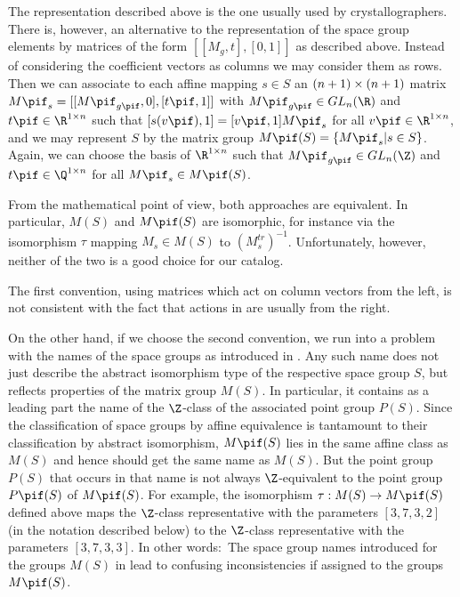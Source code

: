 The representation described above is the one usually used by
crystallographers. There is, however, an alternative to the
representation of the space group elements by matrices of the form
$[ [ M_g, t ], [ 0, 1 ] ]$ as described above. Instead of 
considering the coefficient vectors as columns we may consider 
them as rows.  Then we can associate to each affine mapping
$s \in S$ an $(n+1) \times (n+1)$ matrix $M\pif_s =
[ [ M\pif_{g\pif}, 0 ], [ t\pif, 1 ] ]$ with 
$M\pif_{g\pif} \in GL_n(\R)$ and $t\pif \in \R^{1 \x n}$ such 
that $[s(v\pif),1] = [v\pif,1] M\pif_s$ for all 
$v\pif \in \R^{1 \x n}$, and we may represent $S$ by the matrix 
group $M\pif(S) = \{ M\pif_s | s \in S \}$.  Again, we can choose 
the basis of $\R^{1 \x n}$ such that $M\pif_{g\pif} \in GL_n(\Z)$ 
and $t\pif \in \Q^{1 \x n}$ for all $M\pif_s \in M\pif(S)$.

From the mathematical point of view, both approaches are equivalent. 
In particular, $M(S)$ and $M\pif(S)$ are isomorphic, for instance 
via the isomorphism $\tau$ mapping $M_s \in M(S)$ to 
$(M_s^{tr})^{-1}$.  Unfortunately, however, neither of the two 
is a good choice for our {\GAP} catalog.

The first convention, using matrices which act on column vectors from
the left, is not consistent with the fact that actions in {\GAP} are
usually from the right.

On the other hand, if we choose the second convention, we run into a
problem with the names of the space groups as introduced in
\cite{BBNWZ78}. Any such name does not just describe the abstract
isomorphism type of the respective space group $S$, but reflects
properties of the matrix group $M(S)$.  In particular, it contains as
a leading part the name of the $\Z$-class of the associated point
group $P(S)$.  Since the classification of space groups by affine
equivalence is tantamount to their classification by abstract
isomorphism, $M\pif(S)$ lies in the same affine class as $M(S)$ and
hence should get the same name as $M(S)$.  But the point group $P(S)$
that occurs in that name is not always $\Z$-equivalent to the point
group $P\pif(S)$ of $M\pif(S)$.  For example, the isomorphism $\tau:
M(S) \to M\pif(S)$ defined above maps the $\Z$-class representative
with the parameters $[3,7,3,2]$ (in the notation described below) to
the $\Z$-class representative with the parameters $[3,7,3,3]$.  In
other words:\ The space group names introduced for the groups $M(S)$
in \cite{BBNWZ78} lead to confusing inconsistencies if assigned to the
groups $M\pif(S)$.

